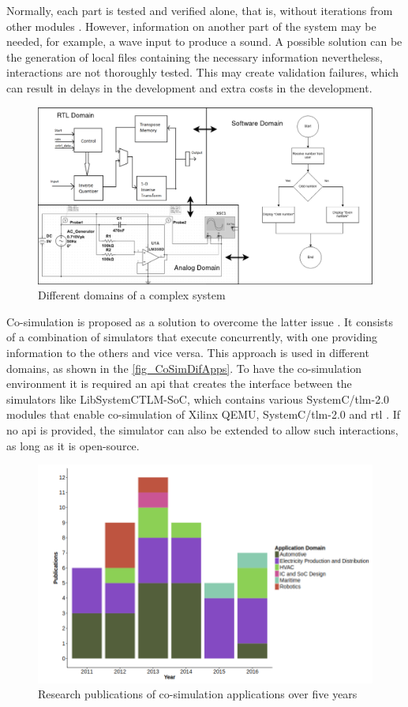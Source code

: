 Normally, each part is tested and verified alone, that is, without iterations from other modules \cite{gomes2017co}. However, information on 
another part of the system may be needed, for example, a wave input to produce a sound. A possible solution can be the generation of local 
files containing the necessary information nevertheless, interactions are not thoroughly tested. This may create validation failures, which 
can result in delays in the development and extra costs in the development.

\begin{figure}[]
	\centering
 	\includegraphics[width=0.9\linewidth]{Images/DomainsComplexSystem.png}
 	\caption{Different domains of a complex system}
	 \label{fig_DomainsComplexSystem}
\end{figure}

Co-simulation is proposed as a solution to overcome the latter issue \cite{gomes2017co}. It consists of a combination of simulators that 
execute concurrently, with one providing information to the others and vice versa. This approach is used in different domains, as shown in 
the \autoref{fig_CoSimDifApps}. To have the co-simulation environment it is required an \gls{api} that creates the interface between the 
simulators like LibSystemCTLM-SoC, which contains various SystemC/\gls{tlm}-2.0 modules that enable co-simulation of Xilinx QEMU, 
SystemC/\gls{tlm}-2.0 and \gls{rtl} \cite{XilinxLibsystemctlm-SOC}. If no \gls{api} is provided, the simulator can also be extended to allow 
such interactions, as long
as it is open-source.

\begin{figure}[]
	\centering
 	\includegraphics[width=0.7\linewidth]{Images/CoSimDifApps.png}
 	\caption{Research publications of co-simulation applications over five years\cite{gomes2017co}}
	 \label{fig_CoSimDifApps}
\end{figure}

